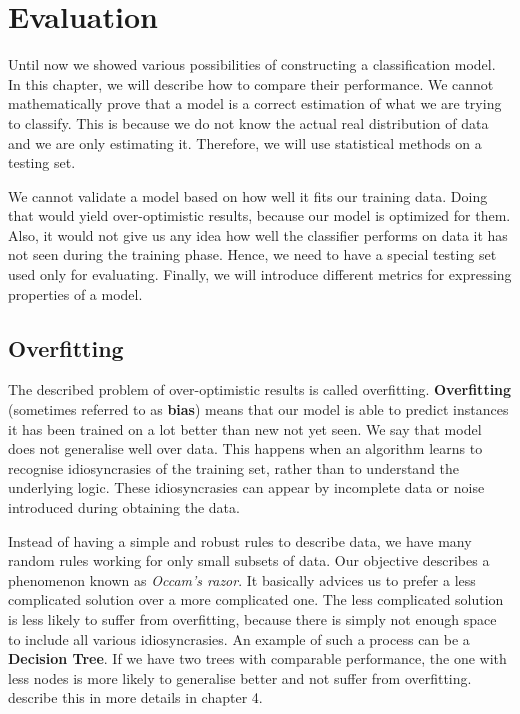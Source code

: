 \chapter{Evaluation}
\label{chap:eval}

Until now we showed various possibilities of constructing a classification model.
In this chapter, we will describe how to compare their performance.
We cannot mathematically prove that a model is a correct estimation of what we are trying to classify.
This is because we do not know the actual real distribution of data and we are only estimating it.
Therefore, we will use statistical methods on a testing set.

We cannot validate a model based on how well it fits our training data.
Doing that would yield over-optimistic results, because our model is optimized for them.
Also, it would not give us any idea how well the classifier performs on data it has not seen during the training phase.
Hence, we need to have a special testing set used only for evaluating.
Finally, we will introduce different metrics for expressing properties of a model.

\section{Overfitting}

The described problem of over-optimistic results is called overfitting.
{\bf Overfitting} (sometimes referred to as {\bf bias}) means that our model is able to predict instances it has been trained on a lot better than new not yet seen.
We say that model does not generalise well over data.
This happens when an algorithm learns to recognise idiosyncrasies of the training set, rather than to understand the underlying logic.
These idiosyncrasies can appear by incomplete data or noise introduced during obtaining the data.

Instead of having a simple and robust rules to describe data, we have many random rules working for only small subsets of data.
Our objective describes a  phenomenon known as {\it Occam's razor}. 
It basically advices us to prefer a less complicated solution over a more complicated one.
The less complicated solution is less likely to suffer from overfitting, because there is simply not enough space to include all various idiosyncrasies.
An example of such a process can be a {\bf Decision Tree}.
If we have two trees with comparable performance, the one with less nodes is more likely to generalise better and not suffer from overfitting.
\citet{TanBachKum08} describe this in more details in chapter 4.

